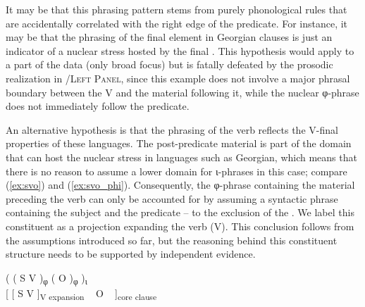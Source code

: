 \documentclass[output=paper,colorlinks,citecolor=brown]{langscibook}
\begin{document}
It may be that this phrasing pattern stems from purely phonological rules that are accidentally correlated with the right edge of the predicate. For instance, it may be that the phrasing of the final element in Georgian  clauses is just an indicator of a nuclear stress hosted by the final . This hypothesis would apply to a part of the data (only broad focus) but is fatally defeated by the prosodic realization in /\textsc{Left Panel}, since this example does not involve a major phrasal boundary between the V and the material following it, while the nuclear φ-phrase does not immediately follow the predicate.

An alternative hypothesis is that the phrasing of the verb reflects the V-final properties of these languages. The post-predicate material is part of the domain that can host the nuclear stress in languages such as Georgian, which means that there is no reason to assume a lower domain for ι-phrases in this case; compare (\ref{ex:svo}) and (\ref{ex:svo_phi}). Consequently, the φ-phrase containing the material preceding the verb can only be accounted for by assuming a syntactic phrase containing the subject and the predicate -- to the exclusion of the . We label this constituent as a projection expanding the verb (V). This conclusion follows from the assumptions introduced so far, but the reasoning behind this constituent structure needs to be supported by independent evidence. 

\ea \label{ex:svo_phi}
        \gll \textup{(} \textup{(} \textup{S} \textup{V} \textup{)\textsubscript{φ}} \textup{(} \textup{O} \textup{)\textsubscript{φ}} \textup{)\textsubscript{ι}} \\
        {[} {[} S V {]}\textsubscript{V expansion} ~ O ~ {]}\textsubscript{core clause}\\
\z
\end{document}
